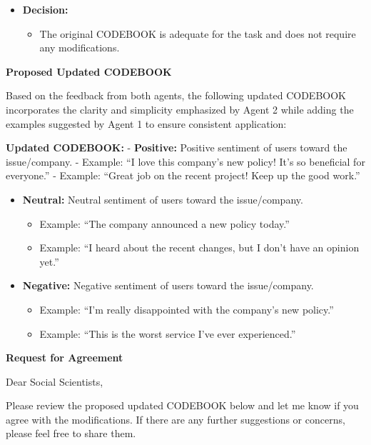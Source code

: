 \begin{itemize}
\tightlist
\item
  \textbf{Decision:}

  \begin{itemize}
  \tightlist
  \item
    The original CODEBOOK is adequate for the task and does not require
    any modifications.
  \end{itemize}
\end{itemize}

\textbf{Proposed Updated CODEBOOK}

Based on the feedback from both agents, the following updated CODEBOOK
incorporates the clarity and simplicity emphasized by Agent 2 while
adding the examples suggested by Agent 1 to ensure consistent
application:

\textbf{Updated CODEBOOK:} - \textbf{Positive:} Positive sentiment of
users toward the issue/company. - Example: ``I love this company's new
policy! It's so beneficial for everyone.'' - Example: ``Great job on the
recent project! Keep up the good work.''

\begin{itemize}
\tightlist
\item
  \textbf{Neutral:} Neutral sentiment of users toward the issue/company.

  \begin{itemize}
  \tightlist
  \item
    Example: ``The company announced a new policy today.''
  \item
    Example: ``I heard about the recent changes, but I don't have an
    opinion yet.''
  \end{itemize}
\item
  \textbf{Negative:} Negative sentiment of users toward the
  issue/company.

  \begin{itemize}
  \tightlist
  \item
    Example: ``I'm really disappointed with the company's new policy.''
  \item
    Example: ``This is the worst service I've ever experienced.''
  \end{itemize}
\end{itemize}

\textbf{Request for Agreement}

Dear Social Scientists,

Please review the proposed updated CODEBOOK below and let me know if you
agree with the modifications. If there are any further suggestions or
concerns, please feel free to share them.


